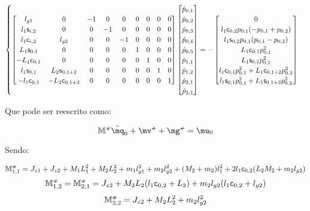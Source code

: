 \begin{itemize}
\begin{equation}
\begin{cases}
\begin{bmatrix}
l_{g1} & 0 & -1 & 0 & 0 & 0 & 0 & 0 & 0 \\
l_1 \mathsf{s}_{i,2} & 0 & 0 & -1 & 0 & 0 & 0 & 0 & 0 \\
l_1 \mathsf{c}_{i,2} & l_{g2}  & 0 & 0 & -1 & 0 & 0 & 0 & 0 \\
L_1 \mathsf{s}_{0,1} & 0 & 0 & 0 & 0 & 1 & 0 & 0 & 0 \\
-L_1 \mathsf{c}_{0,1} & 0 & 0 & 0 & 0 & 0 & 1 & 0 & 0 \\
l_1 \mathsf{s}_{0,1} & L_2 \mathsf{s}_{0,1+2}  & 0 & 0 & 0 & 0 & 0 & 1 & 0 \\
-l_1 \mathsf{c}_{0,1} & -L_2 \mathsf{c}_{0,1+2} & 0 & 0 & 0 & 0 & 0 & 0 & 1 \\
\end{bmatrix}
\begin{bmatrix}
\dot{p}_{0,1} \\
\dot{p}_{0,2} \\
\dot{p}_{0,3} \\
\dot{p}_{0,4} \\
\dot{p}_{0,5} \\
\dot{p}_{1,1} \\
\dot{p}_{1,2} \\
\dot{p}_{2,1} \\
\dot{p}_{2,1} \\
\end{bmatrix}
=
-
\begin{bmatrix}
0 \\
l_1 \mathsf{c}_{0,2} p_{0,1} (-p_{0,1}+p_{0,2}) \\
l_1 \mathsf{s}_{0,2} p_{0,1} (p_{0,1}-p_{0,2}) \\
L_1 \mathsf{c}_{0,1} p_{0,1}^2 \\
L_1 \mathsf{s}_{0,1} p_{0,1}^2 \\
l_1 \mathsf{c}_{0,1} p_{0,1}^2 + L_1 \mathsf{c}_{0,1+2} p_{0,2}^2  \\
l_1 \mathsf{s}_{0,1} p_{0,1}^2 + L_1 \mathsf{s}_{0,1+2} p_{0,2}^2 \\
\end{bmatrix}

\end{cases}
\end{equation}

Que pode ser reescrito como:

\begin{equation}
\mM\ssh \ddot{\mq}_0 + \mv\ssh + \mg\ssh = \mu_0
\end{equation}

Sendo:

\begin{equation}
\mathbb{M}^{\scriptscriptstyle \#}_{1,1} = J_{z1} + J_{z2} + M_1 L_1^2 + M_2 L_2^2 + m_1 l_{g1}^2 + m_2 l_{g2}^2 + (M_2 + m_2)l_1^2 + 2 l_1 \mathsf{c}_{0,2} (L_2 M_2 + m_2 l_{g2})
\end{equation}
\begin{equation}
\mathbb{M}^{\scriptscriptstyle \#}_{1,2} = \mathbb{M}^{\scriptscriptstyle \#}_{2,1} = J_{z2} + M_2 L_2 (l_1 \mathsf{c}_{0,2} + L_2) + m_2 l_{g2} (l_1 \mathsf{c}_{0,2} + l_{g2})
\end{equation}
\begin{equation}
\mathbb{M}^{\scriptscriptstyle \#}_{2,2} = J_{z2} + M_2 L_2^2 + m_2 l_{g2}^2
\end{equation}


\end{itemize}

